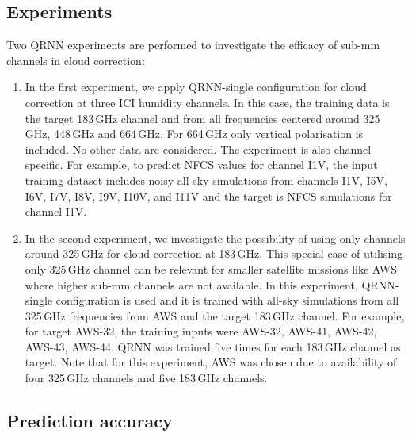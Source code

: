 \documentclass[amt, manuscript]{copernicus}
\begin{document}
\subsection{Experiments}
%
Two QRNN experiments are performed to investigate the efficacy of sub-mm channels in cloud correction: 
\begin{enumerate}
	\item In the first experiment, we apply QRNN-single configuration for cloud correction at three ICI humidity channels. In this case, the training data is the target 183\,GHz channel and from all frequencies  centered around 325\,GHz, 448\,GHz and 664\,GHz. For 664\,GHz only vertical polarisation is included. No other data are considered. The experiment is also channel specific. For example, to predict NFCS values for channel I1V, the input training dataset includes noisy all-sky simulations from channels I1V, I5V, I6V, I7V, I8V, I9V, I10V, and I11V and the target is NFCS simulations for channel I1V.
	
	\item In the second experiment, we investigate the possibility of using only channels around 325\,GHz for cloud correction at 183\,GHz. This special case of utilising only 325\,GHz channel can be relevant for smaller satellite missions like AWS where higher sub-mm channels are not available. In this experiment, QRNN-single configuration is used and it is trained with all-sky simulations from all 325\,GHz frequencies from AWS and the target 183\,GHz channel. For example, for target AWS-32, the training inputs were AWS-32, AWS-41, AWS-42, AWS-43, AWS-44. QRNN was trained five times for each 183\,GHz channel as target. Note that for this experiment, AWS was chosen due to availability of four 325\,GHz channels and five 183\,GHz channels. 	
\end{enumerate}	

\subsection{Prediction accuracy}
\end{document}

